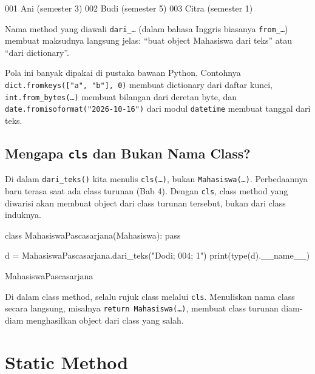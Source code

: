 \begin{keluaran}
001 Ani (semester 3)
002 Budi (semester 5)
003 Citra (semester 1)
\end{keluaran}

Nama method yang diawali \texttt{dari\_\ldots} (dalam bahasa Inggris biasanya \texttt{from\_\ldots}) membuat maksudnya langsung jelas: ``buat object Mahasiswa dari teks'' atau ``dari dictionary''.

\begin{info}
Pola ini banyak dipakai di pustaka bawaan Python. Contohnya \texttt{dict.fromkeys(["a", "b"], 0)} membuat dictionary dari daftar kunci, \texttt{int.from\_bytes(\ldots)} membuat bilangan dari deretan byte, dan \texttt{date.fromisoformat("2026-10-16")} dari modul \texttt{datetime} membuat tanggal dari teks.
\end{info}

\subsection{Mengapa \texttt{cls} dan Bukan Nama Class?}

Di dalam \texttt{dari\_teks()} kita menulis \texttt{cls(\ldots)}, bukan \texttt{Mahasiswa(\ldots)}. Perbedaannya baru terasa saat ada class turunan (Bab 4). Dengan \texttt{cls}, class method yang diwarisi akan membuat object dari class turunan tersebut, bukan dari class induknya.

\begin{kode}
class MahasiswaPascasarjana(Mahasiswa):
    pass

d = MahasiswaPascasarjana.dari_teks("Dodi; 004; 1")
print(type(d).__name__)
\end{kode}

\begin{keluaran}
MahasiswaPascasarjana
\end{keluaran}

\begin{penting}
Di dalam class method, selalu rujuk class melalui \texttt{cls}. Menuliskan nama class secara langsung, misalnya \texttt{return Mahasiswa(\ldots)}, membuat class turunan diam-diam menghasilkan object dari class yang salah.
\end{penting}

\section{Static Method}

